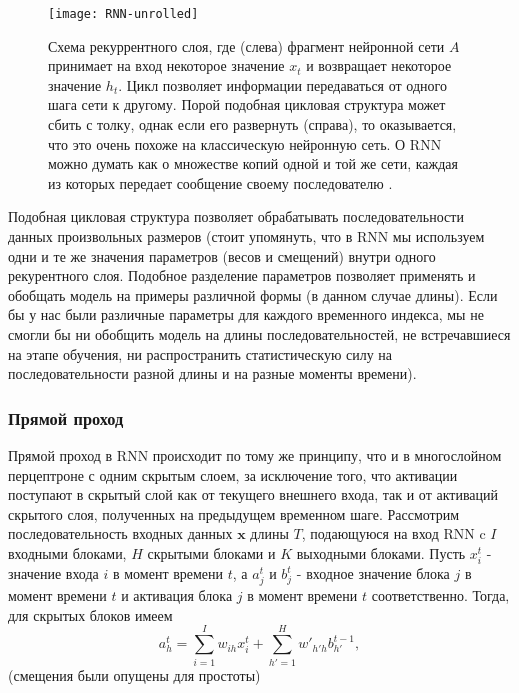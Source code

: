 \begin{figure}[h!]
    \centering
    \texttt{[image: RNN-unrolled]}
    \caption{Схема рекуррентного слоя, где (слева)
    фрагмент нейронной сети $A$ принимает на вход некоторое значение $x_t$ 
    и возвращает некоторое значение $h_t$. Цикл позволяет информации 
    передаваться от одного шага сети к другому. Порой подобная 
    цикловая структура может сбить с толку, однак если его развернуть 
    (справа), то оказывается, что это очень похоже на классическую нейронную 
    сеть. О RNN можно думать как о множестве копий одной и той же сети, 
    каждая из которых передает сообщение своему последователю \cite{colah2}.}
    \label{fig:RNN-unrolled}
\end{figure}

Подобная цикловая структура позволяет обрабатывать последовательности 
данных произвольных размеров (стоит упомянуть, что в RNN мы используем 
одни и те же значения параметров (весов и смещений) 
внутри одного рекурентного слоя. Подобное разделение параметров позволяет 
применять и обобщать модель на примеры различной формы 
(в данном случае длины). Если бы у нас были различные параметры для 
каждого временного индекса, мы не смогли бы ни обобщить
модель на длины последовательностей, не встречавшиеся на этапе обучения, ни 
распространить статистическую силу на последовательности разной длины и 
на разные моменты времени).

\subsubsection{Прямой проход}

Прямой проход в RNN происходит по тому же принципу, что и в 
многослойном перцептроне с одним скрытым слоем, за исключение того, что 
активации поступают в скрытый слой как от текущего внешнего входа, так и 
от активаций скрытого слоя, полученных на предыдущем временном шаге. 
Рассмотрим последовательность входных данных $\bm{x}$ длины $T$, подающуюся 
на вход RNN c $I$ входными блоками, $H$ скрытыми блоками и $K$ выходными 
блоками. Пусть $x_i^t$ - значение входа $i$ в момент времени $t$, а 
$a_j^t$ и $b_j^t$ - входное значение блока $j$ в момент времени $t$ и 
активация блока $j$ в момент времени $t$ соответственно. Тогда, для 
скрытых блоков имеем
\begin{equation*}
    a_h^t = \sum_{i=1}^I w_{ih} x_i^t + \sum_{h'=1}^H w'_{h'h} b_{h'}^{t-1},
\end{equation*}
(смещения были опущены для простоты)

